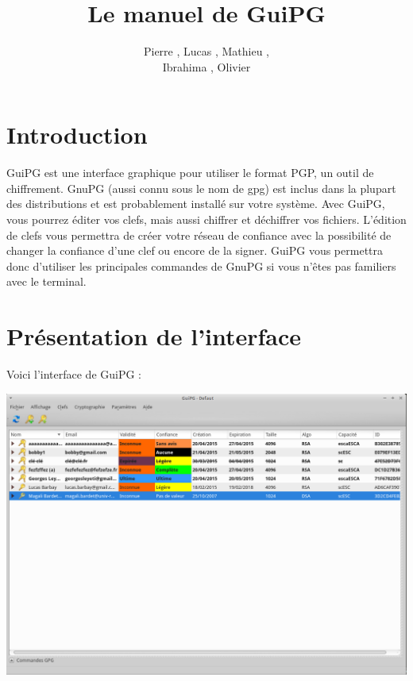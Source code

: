 \documentclass[a4paper,11pt,french]{article}
\begin{document}
\title{Le manuel de GuiPG}
\author{Pierre , Lucas , Mathieu , \\ Ibrahima , Olivier }
\maketitle

\normalsize
\clearpage
\tableofcontents
\clearpage

\section{Introduction}

GuiPG est une interface graphique pour utiliser le format PGP, un outil de chiffrement. GnuPG (aussi connu sous le nom de gpg) est inclus dans la plupart des distributions et est probablement installé sur votre système. Avec GuiPG, vous pourrez éditer vos clefs, mais aussi chiffrer et déchiffrer vos fichiers. L'édition de clefs vous permettra
de créer votre réseau de confiance avec la possibilité de changer la confiance d'une clef ou encore de la signer.
GuiPG vous permettra donc d'utiliser les principales commandes de GnuPG si vous n'êtes pas familiers avec le terminal.

\section{Présentation de l'interface}

Voici l'interface de GuiPG : \bigbreak

\includegraphics[scale=0.3]{interface.png} \bigbreak
\end{document}
